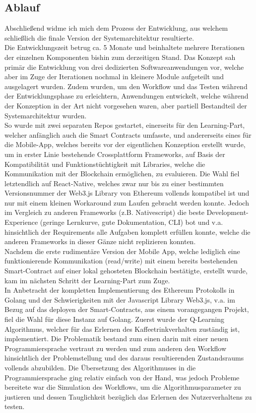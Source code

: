 \subsection{Ablauf}
Abschließend widme ich mich dem Prozess der Entwicklung, aus welchem schließlich die finale Version der Systemarchitektur resultierte. \\
Die Entwicklungszeit betrug ca. 5 Monate und beinhaltete mehrere Iterationen der einzelnen Komponenten bishin zum derzeitigen Stand. Das Konzept sah primär die Entwicklung von drei dedizierten Softwareanwendungen vor, welche aber im Zuge der Iterationen nochmal in kleinere Module aufgeteilt und ausgelagert wurden. Zudem wurden, um den Workflow und das Testen während der Entwicklungsphase zu erleichtern, Anwendungen entwickelt, welche während der Konzeption in der Art nicht vorgesehen waren, aber partiell Bestandteil der Systemarchitektur wurden. \\
So wurde mit zwei separaten Repos gestartet, einerseits für den Learning-Part, welcher anfänglich auch die Smart Contracts umfasste, und andererseits eines für die Mobile-App, welches bereits vor der eigentlichen Konzeption erstellt wurde, um in erster Linie bestehende Crossplattform Frameworks, auf Basis der Kompatibilität und Funktionstüchtigkeit mit Libraries, welche die Kommunikation mit der Blockchain ermöglichen, zu evaluieren. Die Wahl fiel letztendlich auf React-Native, welches zwar nur bis zu einer bestimmten Versionsnummer der Web3.js Library von Ethereum vollends kompatibel ist und nur mit einem kleinen Workaround zum Laufen gebracht werden konnte. 
Jedoch im Vergleich zu anderen Frameworks (z.B. Nativescript) die beste Development-Experience (geringe Lernkurve, gute Dokumentation, CLI) bot und v.a. hinsichtlich der Requirements alle Aufgaben komplett erfüllen konnte, welche die anderen Frameworks in dieser Gänze nicht replizieren konnten. \\
Nachdem die erste rudimentäre Version der Mobile App, welche lediglich eine funktionierende Kommunikation (read/write) mit einem bereits bestehenden Smart-Contract auf einer lokal gehosteten Blockchain bestätigte, erstellt wurde, kam im nächsten Schritt der Learning-Part zum Zuge. \\
In Anbetracht der kompletten Implementierung des Ethereum Protokolls in Golang und der Schwierigkeiten mit der Javascript Library Web3.js, v.a. im Bezug auf das deployen der Smart-Contracts, aus einem vorangegangen Projekt, fiel die Wahl für diese Instanz auf Golang. 
Zuerst wurde der Q-Learning Algorithmus, welcher für das Erlernen des Kaffeetrinkverhalten zuständig ist, implementiert. Die Problematik bestand zum einen darin mit einer neuen Programmiersprache vertraut zu werden und zum anderen den Workflow hinsichtlich der Problemstellung und des daraus resultierenden Zustandsraums vollends abzubilden. Die Übersetzung des Algorithmuses in die Programmiersprache ging relativ einfach von der Hand, was jedoch Probleme bereitete war die Simulation des Workflows, um die Algorithmusparameter zu justieren und dessen Tauglichkeit bezüglich das Erlernen des Nutzerverhaltens zu testen.\\
